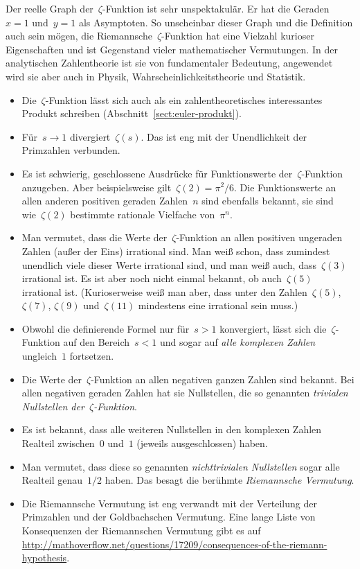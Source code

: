 \documentclass[twoside]{../zirkelblatt1415}
\theoremstyle{definition}
\theoremstyle{plain}
\theoremstyle{remark}
\begin{document}
Der reelle Graph der~$\zeta$-Funktion ist sehr unspektakulär. Er hat
die Geraden~$x = 1$ und~$y = 1$ als Asymptoten.
So unscheinbar dieser Graph und die Definition auch sein mögen, die Riemannsche~$\zeta$-Funktion
hat eine Vielzahl kurioser Eigenschaften und ist Gegenstand vieler
mathematischer Vermutungen. In der analytischen Zahlentheorie ist sie von
fundamentaler Bedeutung, angewendet wird sie aber auch in Physik,
Wahrscheinlichkeitstheorie und Statistik.

\begin{itemize}
\item Die~$\zeta$-Funktion lässt sich auch als ein zahlentheoretisches
interessantes Produkt schreiben (Abschnitt~\ref{sect:euler-produkt}).
\item Für~$s \to 1$ divergiert~$\zeta(s)$. Das ist eng mit der Unendlichkeit
der Primzahlen verbunden.
\item Es ist schwierig, geschlossene Ausdrücke für Funktionswerte
der~$\zeta$-Funktion anzugeben. Aber beispielsweise gilt~$\zeta(2) = \pi^2/6$.
Die Funktionswerte an allen anderen positiven geraden Zahlen~$n$ sind ebenfalls
bekannt, sie sind wie~$\zeta(2)$ bestimmte rationale Vielfache von~$\pi^n$.
\item Man vermutet, dass die Werte der~$\zeta$-Funktion an allen positiven
ungeraden Zahlen (außer der Eins) irrational sind. Man weiß schon, dass zumindest unendlich
viele dieser Werte irrational sind, und man weiß auch, dass~$\zeta(3)$
irrational ist. Es ist aber noch nicht einmal bekannt, ob auch~$\zeta(5)$ irrational
ist. (Kurioserweise weiß man aber, dass unter den Zahlen~$\zeta(5)$,
$\zeta(7)$, $\zeta(9)$ und~$\zeta(11)$ mindestens eine irrational sein muss.)
\item Obwohl die definierende Formel nur für~$s > 1$ konvergiert, lässt sich
die~$\zeta$-Funktion auf den Bereich~$s < 1$ und sogar auf \emph{alle komplexen
Zahlen} ungleich~$1$ fortsetzen.
\item Die Werte der~$\zeta$-Funktion an allen negativen ganzen Zahlen sind
bekannt. Bei allen negativen geraden Zahlen hat sie Nullstellen, die so
genannten \emph{trivialen Nullstellen der~$\zeta$-Funktion}.
\item Es ist bekannt, dass alle weiteren Nullstellen in den komplexen Zahlen
Realteil zwischen~$0$ und~$1$ (jeweils ausgeschlossen) haben.
\item Man vermutet, dass diese so genannten \emph{nichttrivialen Nullstellen}
sogar alle Realteil genau~$1/2$ haben. Das besagt die berühmte \emph{Riemannsche
Vermutung}.
\item Die Riemannsche Vermutung ist eng verwandt mit der Verteilung der
Primzahlen und der Goldbachschen Vermutung. Eine lange Liste von Konsequenzen
der Riemannschen Vermutung gibt es auf
\url{http://mathoverflow.net/questions/17209/consequences-of-the-riemann-hypothesis}.
\end{itemize}
\end{document}
